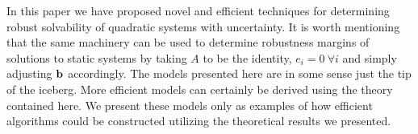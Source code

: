 In this paper we have proposed novel and efficient techniques for determining robust solvability of quadratic systems with uncertainty. 
It is worth mentioning that the same machinery can be used to determine robustness margins of solutions to static systems by taking $A$ to be the identity, $e_i=0 \ \forall i$ and simply adjusting $\bold b$ accordingly. 
The models presented here are in some sense just the tip of the iceberg. 
More efficient models can certainly be derived using the theory contained here. 
We present these models only as examples of how efficient algorithms could be constructed utilizing the theoretical results we presented. 
